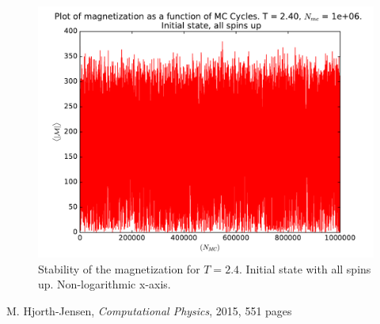\documentclass[12pt]{article}
\begin{document}
\begin{figure}[H]
\centering
\includegraphics[width=\linewidth]{Plots/Magnetization_stability_UpInitSpin_T24.pdf}
\caption{Stability of the magnetization for $T=2.4$. Initial state with all spins up. Non-logarithmic x-axis.}
\end{figure}


\FloatBarrier
\begin{thebibliography}{1}
     M. Hjorth-Jensen, \emph{Computational Physics}, 2015, 551 pages
\end{thebibliography}
\end{document}
